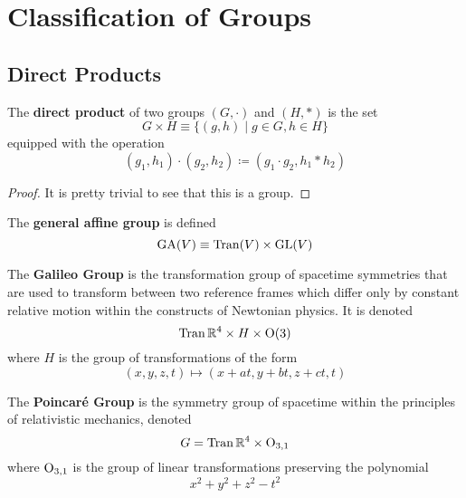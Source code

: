 \section{Classification of Groups} 

\subsection{Direct Products}

  \begin{definition}
    The \textbf{direct product} of two groups $(G, \cdot)$ and $(H, \ast)$ is the set 
    \begin{equation}
      G \times H \equiv \{ (g, h) \mid g \in G, h \in H \}
    \end{equation} 
    equipped with the operation 
    \begin{equation}
      (g_1, h_1) \cdot (g_2, h_2) \coloneqq (g_1 \cdot g_2, h_1 \ast h_2)
    \end{equation}
  \end{definition}
  \begin{proof}
    It is pretty trivial to see that this is a group. 
  \end{proof}

  \begin{example}
    The \textbf{general affine group} is defined 
    \begin{equation}
      \operatorname{GA}(V) \equiv \operatorname{Tran}(V) \times \operatorname{GL}(V)
    \end{equation}
  \end{example}

  \begin{example}
    The \textbf{Galileo Group} is the transformation group of spacetime symmetries that are used to transform between two reference frames which differ only by constant relative motion within the constructs of Newtonian physics. It is denoted 
    \begin{equation}
      \operatorname{Tran} \mathbb{R}^{4} \times H \times \operatorname{O}(3)
    \end{equation}
    where $H$ is the group of transformations of the form 
    \begin{equation}
      (x, y, z, t) \mapsto (x+at, y+bt, z+ct, t)
    \end{equation}
  \end{example}

  \begin{example}
    The \textbf{Poincaré Group} is the symmetry group of spacetime within the principles of relativistic mechanics, denoted
    \begin{equation}
      G = \operatorname{Tran} \mathbb{R}^{4} \times \operatorname{O}_{3,1}
    \end{equation}
    where $\operatorname{O}_{3,1}$ is the group of linear transformations preserving the polynomial 
    \begin{equation}
      x^{2} + y^{2} + z^{2} - t^{2}
    \end{equation}
  \end{example} 

